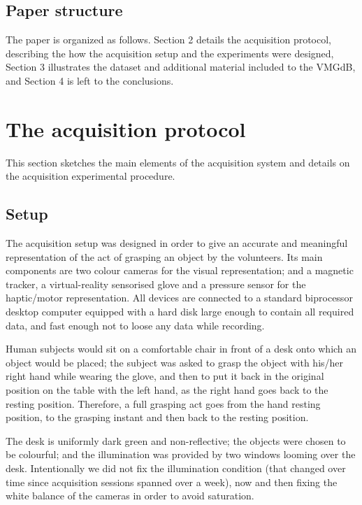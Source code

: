 \documentclass{article}
\newcommand{\db}{\textsf{VMGdB}}
\begin{document}
\subsection{Paper structure}

The paper is organized as follows. Section 2 details the acquisition protocol,
describing the how the acquisition setup and the experiments were designed, 
Section 3 illustrates the dataset and additional material included to the \db,
and Section 4 is left to the conclusions. 

\section{The acquisition protocol}

This section sketches the main elements of the acquisition system and details
on the acquisition experimental procedure.

\subsection{Setup}

The acquisition setup was designed in order to give an accurate and meaningful
representation of the act of grasping an object by the volunteers. Its main
components are two colour cameras for the visual representation; and 
a magnetic tracker, a virtual-reality sensorised glove and a pressure sensor
for the haptic/motor representation. All devices are connected to a standard
biprocessor desktop computer equipped with a hard disk large enough to contain
all required data, and fast enough not to loose any data while recording. 

Human subjects would sit on a comfortable chair in front of a desk onto which %
an object would be placed; the subject was asked to grasp the object with his/her
right hand while wearing the glove, and then to put it back in the original position
on the table with the left hand, as the right hand goes back to the resting position.
Therefore, a full grasping act goes from the hand resting position, to the grasping
instant and then back to the resting position.

The desk is uniformly dark green and non-reflective; the objects were chosen
to be colourful; and the illumination was provided by two windows looming over
the desk. Intentionally we did not fix the illumination condition (that changed
over time since acquisition sessions spanned over a week), now and then fixing
the white balance of the cameras in order to avoid saturation.
\end{document}
